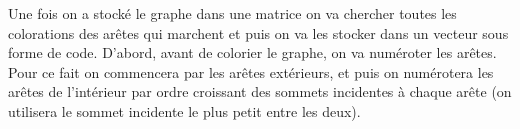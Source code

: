 \documentclass[10pt,a4paper]{article}
\begin{document}










Une fois on a stocké le graphe dans une matrice on va chercher toutes les colorations des arêtes qui marchent et puis on va les stocker dans un vecteur sous forme de code. D'abord, avant de colorier le graphe, on va numéroter les arêtes. Pour ce fait on commencera par les arêtes extérieurs, et puis on numérotera les arêtes de l'intérieur par ordre croissant des sommets incidentes à chaque arête (on utilisera le sommet incidente le plus petit entre les deux).
\end{document}

